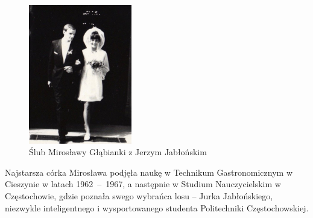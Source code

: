 \begin{figure}
\begin{center}
\includegraphics[width=0.4\textwidth]{zdjecia/slub_jerzego_i_miroslawy_jablonskich.jpg}
\caption{Ślub Mirosławy Głąbianki z Jerzym Jabłońskim}
\label{rys:slub_jerzego_i_miroslawy_jablonskich}
\end{center}
\end{figure}

Najstarsza córka Mirosława podjęła naukę w Technikum Gastronomicznym w Cieszynie w latach 1962~--~1967, a następnie w Studium Nauczycielskim w Częstochowie, gdzie poznała swego wybrańca losu -- Jurka Jabłońskiego, niezwykle inteligentnego i wysportowanego studenta Politechniki Częstochowskiej.

